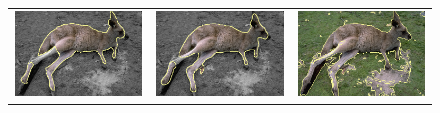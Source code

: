\documentclass[runningheads]{llncs}
\begin{document}
\begin{figure}
\begin{tabular}{ccc}
		\includegraphics[scale=0.2]{images/segmentation/bc/canguru/gc-seg.png} &
		\includegraphics[scale=0.2]{images/segmentation/bc/canguru/corrected-seg.png} &					\includegraphics[scale=0.2]{images/segmentation/schoenemann/canguru/canguru-seg.png}\\		

\end{tabular}
\end{figure}
\end{document}
